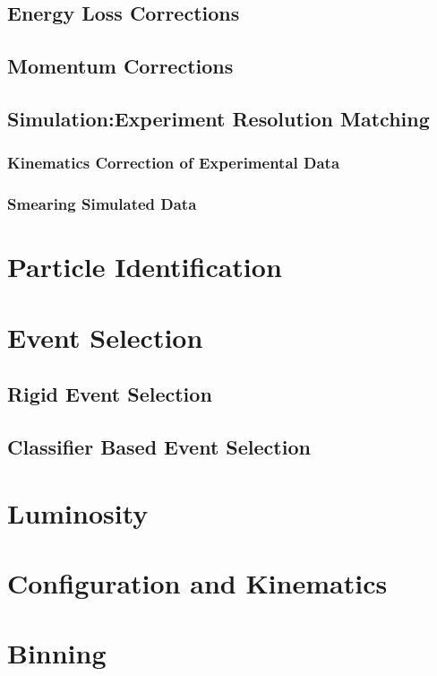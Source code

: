     \subsection{Energy Loss Corrections}
    \subsection{Momentum Corrections}
    \subsection{Simulation:Experiment Resolution Matching}
        \subsubsection{Kinematics Correction of Experimental Data}
        \subsubsection{Smearing Simulated Data}

\section{Particle Identification}

\section{Event Selection}
    \subsection{Rigid Event Selection}
    \subsection{Classifier Based Event Selection}
    
    
\section{Luminosity}
    
    
\section{Configuration and Kinematics}

\section{Binning}

